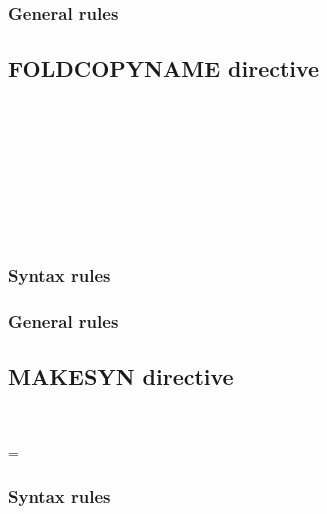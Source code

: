 \subsubsection{General rules}

\subsection{FOLDCOPYNAME directive}

\begin{syntax}[\miscextcolour]
  \begin{1=}
     \\
  \end{1=}
  \literal \\
\end{syntax}

\begin{syntax}[\miscextcolour]
  \begin{1=}
     \\
     \\
  \end{1=} \\
\end{syntax}

\subsubsection{Syntax rules}

\subsubsection{General rules}

\subsection{MAKESYN directive}

\begin{syntax}[\miscextcolour]
  \begin{1=}
     \\
  \end{1=}
  \literal = \literal
\end{syntax}

\subsubsection{Syntax rules}

